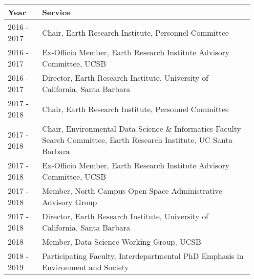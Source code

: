 
\begin{longtable}{lp{15cm}}
Year & Service\\
\hline 
\endhead 
2016 - 2017 & Chair, Earth Research Institute, Personnel Committee \\
2016 - 2017 & Ex-Officio Member, Earth Research Institute Advisory Committee, UCSB \\
2016 - 2017  & Director, Earth Research Institute, University of California, Santa Barbara \\
2017 - 2018 & Chair, Earth Research Institute, Personnel Committee \\
2017 - 2018 & Chair, Environmental Data Science \& Informatics Faculty Search Committee, Earth Research Institute, UC Santa Barbara \\
2017 - 2018 & Ex-Officio Member, Earth Research Institute Advisory Committee, UCSB \\
2017 - 2018 & Member, North Campus Open Space Administrative Advisory Group \\
2017 - 2018  & Director, Earth Research Institute, University of California, Santa Barbara \\
2018 & Member, Data Science Working Group, UCSB \\
2018 - 2019 & Participating Faculty, Interdepartmental PhD Emphasis in Environment and Society \\
\end{longtable}


